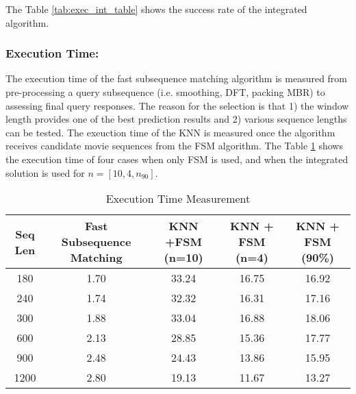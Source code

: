 The Table \ref{tab:exec_int_table} shows the success rate of the integrated algorithm.

\subsubsection{Execution Time:} The execution time of the fast subsequence matching algorithm is measured from pre-processing a query subsequence (i.e. smoothing, DFT, packing MBR) to assessing final query responses. The reason for the selection is that 1) the window length provides one of the best prediction results and 2) various sequence lengths can be tested. The exeuction time of the KNN is measured once the algorithm receives candidate movie sequences from the FSM algorithm. The Table \ref{tab:exec_table} shows the execution time of four cases when only FSM is used, and when the integrated solution is used for $n = [10, 4, n_{90}]$.



\begin{table}[h!]
\begin{center}
\begin{tabular}{|c|| c| c| c| c| }
\hline
Seq Len & Fast Subsequence Matching & KNN +FSM (n=10) & KNN + FSM (n=4) & KNN + FSM (90\%)
\tabularnewline
\hline
180 & 1.70 & 33.24 & 16.75 & 16.92
\tabularnewline
240 & 1.74 & 32.32 & 16.31 & 17.16 
\tabularnewline
300 & 1.88 & 33.04 & 16.88 & 18.06 
\tabularnewline
600 & 2.13 & 28.85 & 15.36 & 17.77
\tabularnewline
900 & 2.48 & 24.43 & 13.86 & 15.95
\tabularnewline
1200 & 2.80 & 19.13 & 11.67 & 13.27
\tabularnewline
\hline
\end{tabular}
\end{center}
\caption{Execution Time Measurement}
\label{tab:exec_table}
\end{table}
